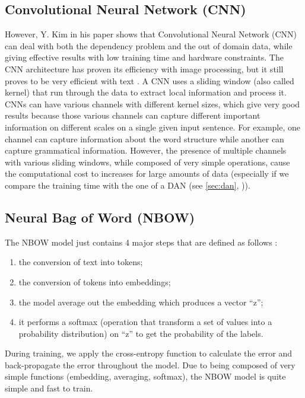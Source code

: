 \subsection{Convolutional Neural Network (CNN) \label{sec:cnn}}
However, Y. Kim in his paper \cite{cnn-2} shows that Convolutional Neural Network (CNN) can deal with both the dependency problem and the out of domain data, while giving effective results with low training time and hardware constraints.
The CNN architecture has proven its efficiency with image processing, but it still proves to be very efficient with text \cite{deep_learning_book, cnn-1}.
A CNN uses a sliding window (also called kernel) that run through the data to extract local information and process it.
CNNs can have various channels with different kernel sizes, which give very good results because those various channels can capture different important information on different scales on a single given input sentence. For example, one channel can capture information about the word structure while another can capture grammatical information.
However, the presence of multiple channels with various sliding windows, while composed of very simple operations, cause the computational cost to increases for large amounts of data (especially if we compare the training time with the one of a DAN (see \autoref{sec:dan}, )).

\subsection{Neural Bag of Word (NBOW) \label{sec:nbow}}
The NBOW model just contains 4 major steps that are defined as follows \cite{bow}:
\begin{enumerate}
	\item the conversion of text into tokens;
	\item the conversion of tokens into embeddings;
	\item the model average out the embedding which produces a vector “z”;
	\item it performs a softmax (operation that transform a set of values into a probability distribution) on “z” to get the probability of the labels.
\end{enumerate}

During training, we apply the cross-entropy function to calculate the error and back-propagate the error throughout the model.
Due to being composed of very simple functions (embedding, averaging, softmax), the NBOW model is quite simple and fast to train.

